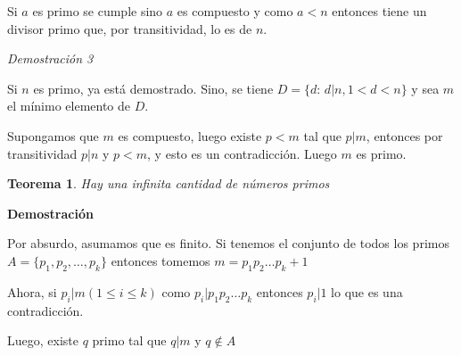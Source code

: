 \documentclass[a4paper,1pt]{report}
\newtheorem*{teo}{Teorema}
\begin{document}
Si $a$ es primo se cumple sino $a$ es compuesto y como $a<n$ entonces tiene un divisor primo que, por transitividad, lo es de $n$.

\textit{Demostración 3}

Si $n$ es primo, ya está demostrado.
Sino, se tiene $D=\{d : \, d|n, 1<d<n\}$ y sea $m$ el mínimo elemento de $D$. 

Supongamos que $m$ es compuesto, luego existe $p<m$ tal que $p|m$, entonces por transitividad $p|n$ y $p<m$, y esto es un contradicción. Luego $m$ es primo.

\begin{teo}
 Hay una infinita cantidad de números primos
\end{teo}

\textbf{Demostración}

Por absurdo, asumamos que es finito.
Si tenemos el conjunto de todos los primos $A=\{p_1,p_2,\dots ,p_k\}$
entonces tomemos $m=p_1p_2\dots p_k+1$

Ahora, si $p_i|m (1\leq i\leq k)$ como $p_i|p_1p_2\dots p_k$  entonces $p_i|1$ lo que es una contradicción.

Luego, existe $q$ primo tal que $q|m$ y $q\not\in A$
\end{document}
